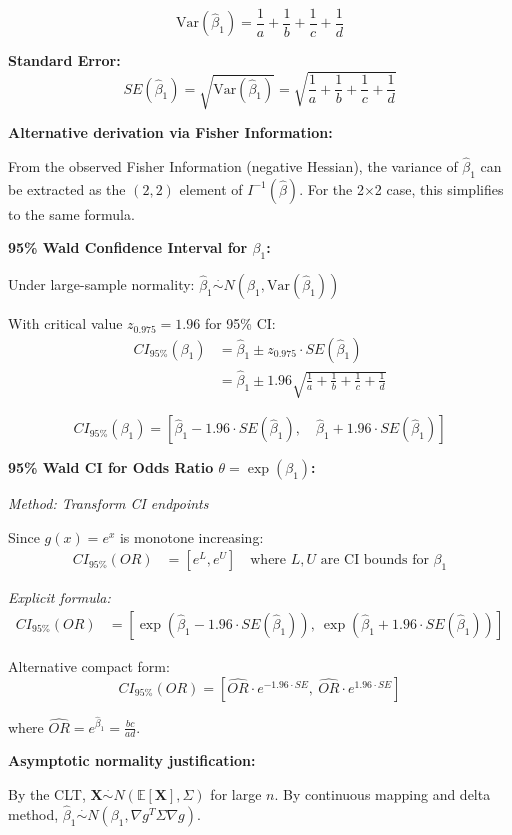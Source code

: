\documentclass[12pt]{article}
\begin{document}
\begin{solution}
\[
\boxed{\text{Var}(\hat{\beta}_1) = \frac{1}{a} + \frac{1}{b} + \frac{1}{c} + \frac{1}{d}}
\]

\textbf{Standard Error:}
\[
SE(\hat{\beta}_1) = \sqrt{\text{Var}(\hat{\beta}_1)} = \sqrt{\frac{1}{a} + \frac{1}{b} + \frac{1}{c} + \frac{1}{d}}
\]

\textbf{Alternative derivation via Fisher Information:}

From the observed Fisher Information (negative Hessian), the variance of $\hat{\beta}_1$ can be extracted as the $(2,2)$ element of $I^{-1}(\hat{\beta})$. For the 2$\times$2 case, this simplifies to the same formula.

\textbf{95\% Wald Confidence Interval for $\beta_1$:}

Under large-sample normality: $\hat{\beta}_1 \stackrel{\cdot}{\sim} N(\beta_1, \text{Var}(\hat{\beta}_1))$

With critical value $z_{0.975} = 1.96$ for 95\% CI:
\begin{align*}
CI_{95\%}(\beta_1) &= \hat{\beta}_1 \pm z_{0.975} \cdot SE(\hat{\beta}_1) \\
&= \hat{\beta}_1 \pm 1.96\sqrt{\frac{1}{a} + \frac{1}{b} + \frac{1}{c} + \frac{1}{d}}
\end{align*}

\[
\boxed{CI_{95\%}(\beta_1) = \left[\hat{\beta}_1 - 1.96 \cdot SE(\hat{\beta}_1), \quad \hat{\beta}_1 + 1.96 \cdot SE(\hat{\beta}_1)\right]}
\]

\textbf{95\% Wald CI for Odds Ratio $\theta = \exp(\beta_1)$:}

\textit{Method: Transform CI endpoints}

Since $g(x) = e^x$ is monotone increasing:
\begin{align*}
CI_{95\%}(OR) &= [e^{L}, e^{U}] \quad \text{where } L, U \text{ are CI bounds for } \beta_1
\end{align*}

\textit{Explicit formula:}
\begin{align*}
CI_{95\%}(OR) &= \left[\exp\left(\hat{\beta}_1 - 1.96 \cdot SE(\hat{\beta}_1)\right), \ \exp\left(\hat{\beta}_1 + 1.96 \cdot SE(\hat{\beta}_1)\right)\right]
\end{align*}

Alternative compact form:
\[
\boxed{CI_{95\%}(OR) = \left[\widehat{OR} \cdot e^{-1.96 \cdot SE}, \ \widehat{OR} \cdot e^{1.96 \cdot SE}\right]}
\]

where $\widehat{OR} = e^{\hat{\beta}_1} = \frac{bc}{ad}$.

\textbf{Asymptotic normality justification:}

By the CLT, $\mathbf{X} \stackrel{\cdot}{\sim} N(\mathbb{E}[\mathbf{X}], \Sigma)$ for large $n$. By continuous mapping and delta method, $\hat{\beta}_1 \stackrel{\cdot}{\sim} N(\beta_1, \nabla g^T \Sigma \nabla g)$.
\end{solution}
\end{document}
